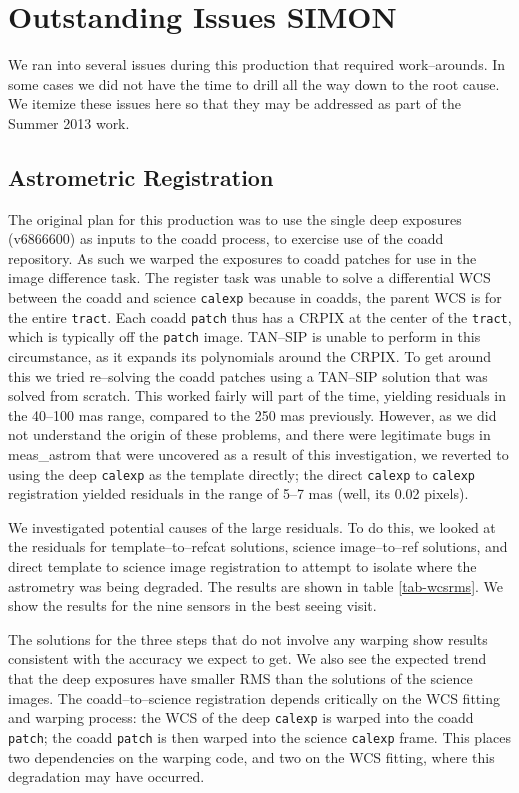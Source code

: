 \documentclass[prd, nofootinbib, floatfix, 11pt,tightenlines,times]{article}
\begin{document}
\section{Outstanding Issues {\bf SIMON}}
We ran into several issues during this production that required work--arounds.  
In some cases we did not have the time to drill all the way down
to the root cause.  We itemize these issues here so that they may be addressed 
as part of the Summer 2013 work.


\subsection{Astrometric Registration \label{subsec-astrom}}
The original plan for this production was to use the single deep exposures (v6866600) as 
inputs to the coadd process, to exercise use of the coadd repository.  As 
such we warped the exposures to coadd patches for use in the image difference
task.  The register task was unable to solve a differential WCS between the coadd
and science {\tt calexp} because in coadds, the parent WCS is for the entire {\tt tract}.
Each coadd {\tt patch} thus has a CRPIX at the center of the {\tt tract}, which is
typically off the {\tt patch} image.  TAN--SIP is unable to perform in this circumstance,
as it expands its polynomials around the CRPIX.  To get around this 
we tried re--solving the coadd patches using a TAN--SIP solution that was solved from
scratch.  This worked fairly will part of the time,
yielding residuals in the 40--100 mas range, compared to the 250 mas previously.  However,
as we did not understand the origin of these problems, and there were legitimate bugs
in meas\_astrom  that were uncovered as a result of this investigation, we reverted to
using the deep {\tt calexp} as the template directly; the direct {\tt calexp} to {\tt calexp} 
registration yielded residuals in the range of 5--7 mas (well, its 0.02 pixels).

We investigated potential causes of the large residuals.  To do this, we looked at the 
residuals for template--to--refcat solutions, science image--to--ref solutions, and 
direct template to science image registration to attempt to isolate where the astrometry 
was being degraded.  The results are shown
in table \ref{tab-wcsrms}.  We show the results for the nine sensors in the best seeing visit.  

The solutions for the three steps that do not involve any warping show results consistent with 
the accuracy we expect to get.  We also see the expected trend that the deep exposures have 
smaller RMS than the solutions of the science images.  The coadd--to--science registration
depends critically on the WCS fitting and warping process: the WCS of the deep {\tt calexp} is warped
into the coadd {\tt patch}; the coadd {\tt patch} is then warped into the science {\tt calexp} frame.
This places two dependencies on the warping code, and two on the WCS fitting, where
this degradation may have occurred.
\end{document}
